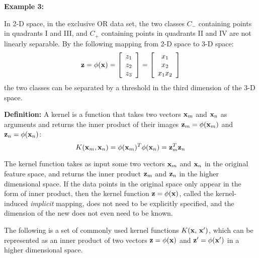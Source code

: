\documentclass{article}
\begin{document}
{\bf Example 3:}

In 2-D space, in the exclusive OR data set, the two classes $C_-$ 
containing points in quadrants I and III, and $C_+$ containing
points in quadrants II and IV are not linearly separable. By the
following mapping from 2-D space to 3-D space:
\begin{equation}
  {\bf z}=\phi({\bf x})=\left[\begin{array}{l}z_1\\z_2\\z_3\end{array}\right]
  =\left[\begin{array}{c}x_1\\x_2\\x_1x_2\end{array}\right]
\end{equation}
the two classes can be separated by a threshold in the third 
dimension of the 3-D space.


{\bf Definition: } A kernel is a function that takes two vectors 
${\bf x}_m$ and ${\bf x}_n$ as arguments and returns the inner product 
of their images ${\bf z}_m=\phi({\bf x}_m)$ and ${\bf z}_n=\phi({\bf x}_n)$:
\begin{equation}	
  K({\bf x}_m,{\bf x}_n)=\phi({\bf x}_m)^T\phi({\bf x}_n) 
  ={\bf z}_m^T{\bf z}_n
\end{equation}

The kernel function takes as input some two vectors ${\bf x}_m$
and ${\bf x}_n$ in the original feature space, and returns the inner 
product ${\bf z}_m$ and ${\bf z}_n$ in the higher dimensional space. 
If the data points in the original space only appear in the form of 
inner product, then the kernel function ${\bf z}=\phi({\bf x})$,
called the kernel-induced {\em implicit} mapping, does not need to
be explicitly specified, and the dimension of the new does not even 
need to be known. 

The following is a set of commonly used kernel functions 
$K({\bf x},\,{\bf x}')$, which can be represented as an 
inner product of two vectors ${\bf z}=\phi({\bf x})$ and 
${\bf z}'=\phi({\bf x}')$ in a higher dimensional space.
\end{document}
